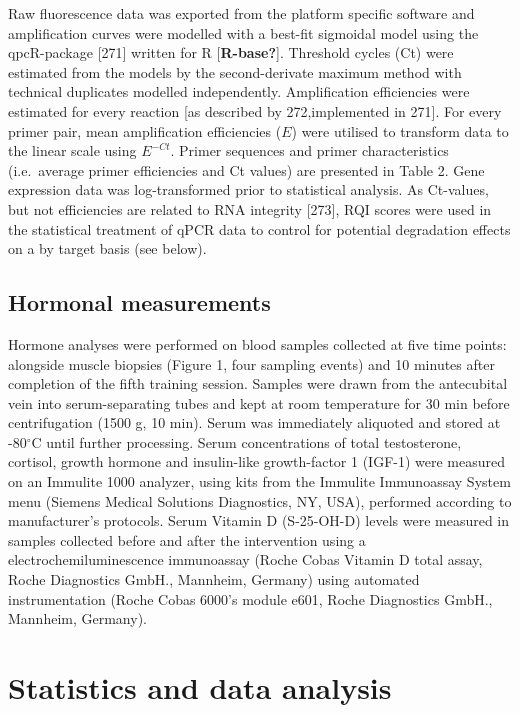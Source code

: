 \documentclass[twoside,10pt]{gihclass} %
\begin{document}
Raw fluorescence data was exported from the platform specific software and amplification curves were modelled with a best-fit sigmoidal model using the qpcR-package {[}271{]} written for R {[}\textbf{R-base?}{]}. Threshold cycles (Ct) were estimated from the models by the second-derivate maximum method with technical duplicates modelled independently.
Amplification efficiencies were estimated for every reaction {[}as described by 272,implemented in 271{]}. For every primer pair, mean amplification efficiencies (\(E\)) were utilised to transform data to the linear scale using \(E^{-Ct}\). Primer sequences and primer characteristics (i.e.~average primer efficiencies and Ct values) are presented in Table 2. Gene expression data was log-transformed prior to statistical analysis. As Ct-values, but not efficiencies are related to RNA integrity {[}273{]}, RQI scores were used in the statistical treatment of qPCR data to control for potential degradation effects on a by target basis (see below).

\hypertarget{hormonal-measurements}{%
\subsection{Hormonal measurements}\label{hormonal-measurements}}

Hormone analyses were performed on blood samples collected at five time points: alongside muscle biopsies (Figure 1, four sampling events) and 10 minutes after completion of the fifth training session. Samples were drawn from the antecubital vein into serum-separating tubes and kept at room temperature for 30 min before centrifugation (1500 g, 10 min). Serum was immediately aliquoted and stored at -80\(^{\circ}\)C until further processing. Serum concentrations of total testosterone, cortisol, growth hormone and insulin-like growth-factor 1 (IGF-1) were measured on an Immulite 1000 analyzer, using kits from the Immulite Immunoassay System menu (Siemens Medical Solutions Diagnostics, NY, USA), performed according to manufacturer's protocols. Serum Vitamin D (S-25-OH-D) levels were measured in samples collected before and after the intervention using a electrochemiluminescence immunoassay (Roche Cobas Vitamin D total assay, Roche Diagnostics GmbH., Mannheim, Germany) using automated instrumentation (Roche Cobas 6000's module e601, Roche Diagnostics GmbH., Mannheim, Germany).

\hypertarget{statistics-and-data-analysis}{%
\section{Statistics and data analysis}\label{statistics-and-data-analysis}}
\end{document}
